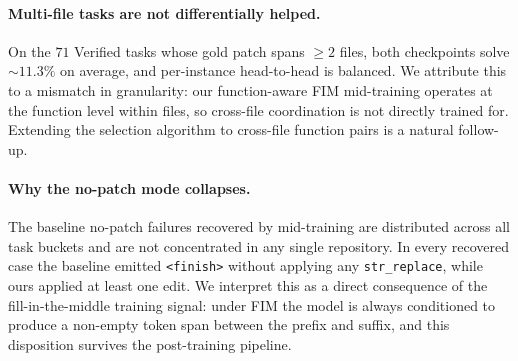 \paragraph{Multi-file tasks are not differentially helped.}
On the $71$ Verified tasks whose gold patch spans $\ge 2$ files, both
checkpoints solve $\sim\!11.3\%$ on average, and per-instance head-to-head
is balanced. We attribute this to a mismatch in granularity: our
function-aware FIM mid-training operates at the function level within
files, so cross-file coordination is not directly trained for. Extending
the selection algorithm to cross-file function pairs is a natural
follow-up.

\paragraph{Why the no-patch mode collapses.}
The baseline no-patch failures recovered by mid-training are distributed
across all task buckets and are not concentrated in any single repository.
In every recovered case the baseline emitted \texttt{<finish>} without
applying any \texttt{str\_replace}, while ours applied at least one edit.
We interpret this as a direct consequence of the fill-in-the-middle
training signal: under FIM the model is always conditioned to produce a
non-empty token span between the prefix and suffix, and this disposition
survives the post-training pipeline.
